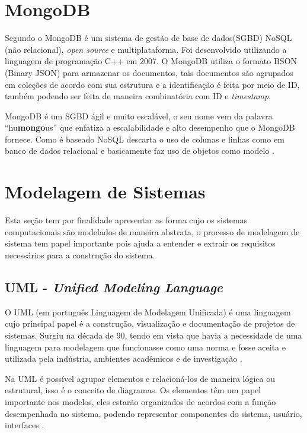 \section{MongoDB} 
    Segundo \cite{mongodb} o MongoDB é um sistema de gestão de base de dados(SGBD) NoSQL (não relacional), \textit{open source} e multiplataforma. Foi desenvolvido utilizando a linguagem de programação C++ em 2007. O MongoDB utiliza o formato BSON (Binary JSON) para armazenar os documentos, tais documentos são agrupados em coleções de acordo com sua estrutura e a identificação é feita por meio de ID, também podendo ser feita de maneira combinatória com ID e \textit{timestamp}. 
    \par
    MongoDB é um SGBD ágil e muito escalável, o seu nome vem da palavra ``hu\textbf{mongo}us'' que enfatiza a escalabilidade e alto desempenho que o MongoDB fornece. Como é baseado NoSQL descarta o uso de colunas e linhas como em banco de dados relacional e basicamente faz uso de objetos como modelo \cite{dayley2014node}.
\section{Modelagem de Sistemas}
    Esta seção tem por finalidade apresentar as forma cujo os sistemas computacionais são modelados de maneira abstrata, o processo de modelagem de sistema tem papel importante pois ajuda a entender e extrair os requisitos necessários para a construção do sistema.
    \subsection{UML - \textit{Unified Modeling Language}}
    O UML (em português Linguagem de Modelagem Unificada) é uma linguagem cujo principal papel é a construção, visualização e documentação de projetos de sistemas. Surgiu na década de 90, tendo em vista que havia a necessidade de uma linguagem para modelagem que funcionasse como uma norma e fosse aceita e utilizada pela indústria, ambientes acadêmicos e de investigação \cite{uml}.
    \par
    Na UML é possível agrupar elementos e relacioná-los de maneira lógica ou estrutural, isso é o conceito de diagramas. Os elementos têm um papel importante nos modelos, eles estarão organizados de acordos com a função desempenhada no sistema, podendo representar componentes do sistema, usuário, interfaces \cite{uml}.
    
